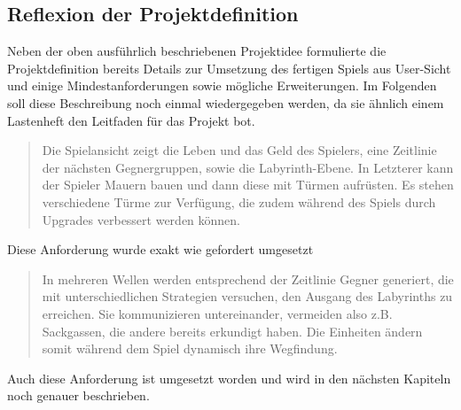 \subsection{Reflexion der Projektdefinition} %
\label{sub:reflexion_der_projektdefinition}

Neben der oben ausführlich beschriebenen Projektidee formulierte die Projektdefinition bereits Details zur Umsetzung des fertigen Spiels aus User-Sicht und einige Mindestanforderungen sowie mögliche Erweiterungen. Im Folgenden soll diese Beschreibung noch einmal wiedergegeben werden, da sie ähnlich einem Lastenheft den Leitfaden für das Projekt bot.

\begin{quotation}
Die Spielansicht zeigt die Leben und das Geld des Spielers, eine Zeitlinie der nächsten Gegnergruppen,
sowie die Labyrinth-Ebene. In Letzterer kann der Spieler Mauern bauen und dann diese mit Türmen
aufrüsten. Es stehen verschiedene Türme zur Verfügung, die zudem während des Spiels durch
Upgrades verbessert werden können.
\end{quotation}
Diese Anforderung wurde exakt wie gefordert umgesetzt
\begin{quotation}
In mehreren Wellen werden entsprechend der Zeitlinie Gegner generiert, die mit unterschiedlichen
Strategien versuchen, den Ausgang des Labyrinths zu erreichen. Sie kommunizieren untereinander,
vermeiden also z.B. Sackgassen, die andere bereits erkundigt haben. Die Einheiten ändern somit
während dem Spiel dynamisch ihre Wegfindung.
\end{quotation}
Auch diese Anforderung ist umgesetzt worden und wird in den nächsten Kapiteln noch genauer beschrieben.

